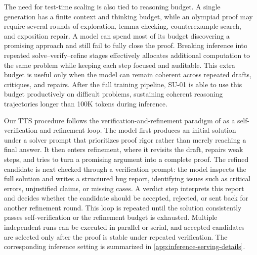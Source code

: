 \documentclass{llmxive}
\begin{document}
The need for test-time scaling is also tied to reasoning budget. A single generation has a
finite context and thinking budget, while an olympiad proof may require several
rounds of exploration, lemma checking, counterexample search, and exposition
repair. A model can spend most of its budget discovering a promising approach
and still fail to fully close the proof. Breaking inference into repeated
solve--verify--refine stages effectively allocates additional computation to the
same problem while keeping each step focused and auditable. This extra budget is
useful only when the model can remain coherent across repeated drafts,
critiques, and repairs. 
After the full training pipeline, SU-01 is able to use
this budget productively on difficult problems, sustaining coherent reasoning
trajectories longer than 100K tokens during inference.

Our TTS procedure follows the verification-and-refinement paradigm of
\citet{huang2025winning} as a self-verification and refinement loop. The model
first produces an initial solution under a solver prompt that prioritizes proof
rigor rather than merely reaching a final answer. It then enters refinement,
where it revisits the draft, repairs weak steps, and tries to turn a promising
argument into a complete proof. The refined candidate is next checked through a
verification prompt: the model inspects the full solution and writes a structured
bug report, identifying issues such as critical errors, unjustified claims, or
missing cases. A verdict step interprets this report and decides whether the
candidate should be accepted, rejected, or sent back for another refinement
round. This loop is repeated until the solution consistently passes
self-verification or the refinement budget is exhausted. Multiple independent
runs can be executed in parallel or serial, and accepted candidates are selected
only after the proof is stable under repeated verification. The corresponding
inference setting is summarized in \cref{app:inference-serving-details}.

\end{document}

